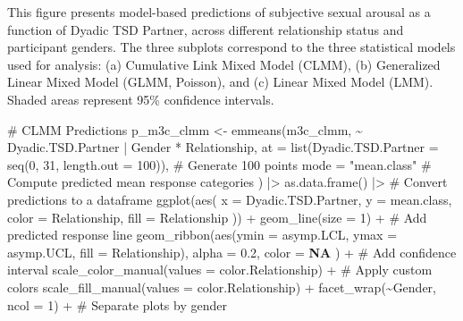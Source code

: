 \documentclass[
  bookmarksnumbered]{article}
\newenvironment{Shaded}{\begin{snugshade}}{\end{snugshade}}
\newcommand{\AttributeTok}[1]{\textcolor[rgb]{0.80,0.80,0.80}{#1}}
\newcommand{\CommentTok}[1]{\textcolor[rgb]{0.50,0.62,0.50}{#1}}
\newcommand{\ConstantTok}[1]{\textcolor[rgb]{0.86,0.64,0.64}{\textbf{#1}}}
\newcommand{\DecValTok}[1]{\textcolor[rgb]{0.86,0.86,0.80}{#1}}
\newcommand{\FloatTok}[1]{\textcolor[rgb]{0.75,0.75,0.82}{#1}}
\newcommand{\FunctionTok}[1]{\textcolor[rgb]{0.94,0.94,0.56}{#1}}
\newcommand{\NormalTok}[1]{\textcolor[rgb]{0.80,0.80,0.80}{#1}}
\newcommand{\OtherTok}[1]{\textcolor[rgb]{0.94,0.94,0.56}{#1}}
\newcommand{\SpecialCharTok}[1]{\textcolor[rgb]{0.86,0.64,0.64}{#1}}
\newcommand{\StringTok}[1]{\textcolor[rgb]{0.80,0.58,0.58}{#1}}
\begin{document}
This figure presents model-based predictions of subjective sexual arousal as a function of Dyadic TSD Partner, across different relationship status and participant genders. The three subplots correspond to the three statistical models used for analysis: (a) Cumulative Link Mixed Model (CLMM), (b) Generalized Linear Mixed Model (GLMM, Poisson), and (c) Linear Mixed Model (LMM). Shaded areas represent 95\% confidence intervals.

\begin{Shaded}
\begin{Highlighting}[]
\CommentTok{\# CLMM Predictions}
\NormalTok{p\_m3c\_clmm }\OtherTok{\textless{}{-}} \FunctionTok{emmeans}\NormalTok{(m3c\_clmm, }\SpecialCharTok{\textasciitilde{}}\NormalTok{ Dyadic.TSD.Partner }\SpecialCharTok{|}\NormalTok{ Gender }\SpecialCharTok{*}\NormalTok{ Relationship,}
  \AttributeTok{at =} \FunctionTok{list}\NormalTok{(}\AttributeTok{Dyadic.TSD.Partner =} \FunctionTok{seq}\NormalTok{(}\DecValTok{0}\NormalTok{, }\DecValTok{31}\NormalTok{, }\AttributeTok{length.out =} \DecValTok{100}\NormalTok{)), }\CommentTok{\# Generate 100 points}
  \AttributeTok{mode =} \StringTok{"mean.class"} \CommentTok{\# Compute predicted mean response categories}
\NormalTok{) }\SpecialCharTok{|\textgreater{}}
  \FunctionTok{as.data.frame}\NormalTok{() }\SpecialCharTok{|\textgreater{}} \CommentTok{\# Convert predictions to a dataframe}
  \FunctionTok{ggplot}\NormalTok{(}\FunctionTok{aes}\NormalTok{(}
    \AttributeTok{x =}\NormalTok{ Dyadic.TSD.Partner, }\AttributeTok{y =}\NormalTok{ mean.class,}
    \AttributeTok{color =}\NormalTok{ Relationship, }\AttributeTok{fill =}\NormalTok{ Relationship}
\NormalTok{  )) }\SpecialCharTok{+}
  \FunctionTok{geom\_line}\NormalTok{(}\AttributeTok{size =} \DecValTok{1}\NormalTok{) }\SpecialCharTok{+} \CommentTok{\# Add predicted response line}
  \FunctionTok{geom\_ribbon}\NormalTok{(}\FunctionTok{aes}\NormalTok{(}\AttributeTok{ymin =}\NormalTok{ asymp.LCL, }\AttributeTok{ymax =}\NormalTok{ asymp.UCL, }\AttributeTok{fill =}\NormalTok{ Relationship),}
    \AttributeTok{alpha =} \FloatTok{0.2}\NormalTok{, }\AttributeTok{color =} \ConstantTok{NA}
\NormalTok{  ) }\SpecialCharTok{+} \CommentTok{\# Add confidence interval}
  \FunctionTok{scale\_color\_manual}\NormalTok{(}\AttributeTok{values =}\NormalTok{ color.Relationship) }\SpecialCharTok{+} \CommentTok{\# Apply custom colors}
  \FunctionTok{scale\_fill\_manual}\NormalTok{(}\AttributeTok{values =}\NormalTok{ color.Relationship) }\SpecialCharTok{+}
  \FunctionTok{facet\_wrap}\NormalTok{(}\SpecialCharTok{\textasciitilde{}}\NormalTok{Gender, }\AttributeTok{ncol =} \DecValTok{1}\NormalTok{) }\SpecialCharTok{+} \CommentTok{\# Separate plots by gender}

\end{Highlighting}
\end{Shaded}
\end{document}
